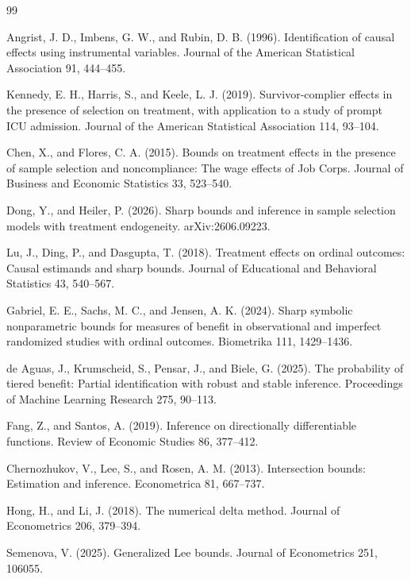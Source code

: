 \documentclass{article}
\begin{document}
\begin{thebibliography}{99}

   Angrist, J. D., Imbens, G. W., and Rubin, D. B. (1996). Identification of causal effects using instrumental variables. Journal of the American Statistical Association 91, 444--455.

   Kennedy, E. H., Harris, S., and Keele, L. J. (2019). Survivor-complier effects in the presence of selection on treatment, with application to a study of prompt ICU admission. Journal of the American Statistical Association 114, 93--104.

   Chen, X., and Flores, C. A. (2015). Bounds on treatment effects in the presence of sample selection and noncompliance: The wage effects of Job Corps. Journal of Business and Economic Statistics 33, 523--540.

   Dong, Y., and Heiler, P. (2026). Sharp bounds and inference in sample selection models with treatment endogeneity. arXiv:2606.09223.

   Lu, J., Ding, P., and Dasgupta, T. (2018). Treatment effects on ordinal outcomes: Causal estimands and sharp bounds. Journal of Educational and Behavioral Statistics 43, 540--567.

   Gabriel, E. E., Sachs, M. C., and Jensen, A. K. (2024). Sharp symbolic nonparametric bounds for measures of benefit in observational and imperfect randomized studies with ordinal outcomes. Biometrika 111, 1429--1436.

   de Aguas, J., Krumscheid, S., Pensar, J., and Biele, G. (2025). The probability of tiered benefit: Partial identification with robust and stable inference. Proceedings of Machine Learning Research 275, 90--113.

   Fang, Z., and Santos, A. (2019). Inference on directionally differentiable functions. Review of Economic Studies 86, 377--412.

   Chernozhukov, V., Lee, S., and Rosen, A. M. (2013). Intersection bounds: Estimation and inference. Econometrica 81, 667--737.

   Hong, H., and Li, J. (2018). The numerical delta method. Journal of Econometrics 206, 379--394.

   Semenova, V. (2025). Generalized Lee bounds. Journal of Econometrics 251, 106055.


\end{thebibliography}
\end{document}
